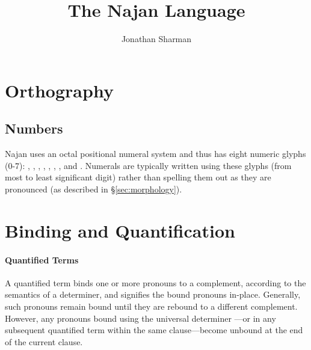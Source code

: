 \NewDocumentCommand{\down}{}{$\Downarrow$ \\}

\title{ \\ The Najan Language}
\author{Jonathan Sharman}



\listoftodos

\maketitle

\tableofcontents

\twocolumn

\section{Orthography} \label{sec:orthography}

\subsection{Numbers}


Najan uses an octal positional numeral system and thus has eight numeric glyphs
(0-7): , , , , , , , and
. Numerals are typically written using these glyphs (from most to least
significant digit) rather than spelling them out as they are pronounced (as
described in \S\ref{sec:morphology}).

\section{Binding and Quantification} \label{sec:binding}

\paragraph{Quantified Terms} A quantified term binds one or more pronouns to a
complement, according to the semantics of a determiner, and signifies the bound
pronouns in-place. Generally, such pronouns remain bound until they are rebound
to a different complement. However, any pronouns bound using the universal
determiner ---or in any subsequent quantified term within the same
clause---become unbound at the end of the current clause.


